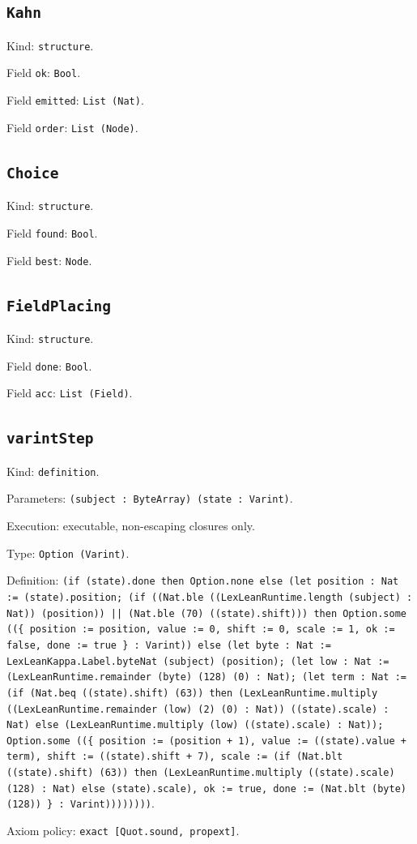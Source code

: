 \documentclass[11pt]{article}
\begin{document}
\subsection*{\texttt{Kahn}}
\noindent Kind: \texttt{structure}.\par
\noindent Field \texttt{ok}: \texttt{Bool}.\par
\noindent Field \texttt{emitted}: \texttt{List (Nat)}.\par
\noindent Field \texttt{order}: \texttt{List (Node)}.\par
\subsection*{\texttt{Choice}}
\noindent Kind: \texttt{structure}.\par
\noindent Field \texttt{found}: \texttt{Bool}.\par
\noindent Field \texttt{best}: \texttt{Node}.\par
\subsection*{\texttt{FieldPlacing}}
\noindent Kind: \texttt{structure}.\par
\noindent Field \texttt{done}: \texttt{Bool}.\par
\noindent Field \texttt{acc}: \texttt{List (Field)}.\par
\subsection*{\texttt{varintStep}}
\noindent Kind: \texttt{definition}.\par
\noindent Parameters: \texttt{(subject : ByteArray) (state : Varint)}.\par
\noindent Execution: executable, non-escaping closures only.\par
\noindent Type: \texttt{Option (Varint)}.\par
\noindent Definition: \texttt{(if (state).done then Option.none else (let position : Nat := (state).position; (if ((Nat.ble ((LexLeanRuntime.length (subject) : Nat)) (position)) || (Nat.ble (70) ((state).shift))) then Option.some ((\{ position := position, value := 0, shift := 0, scale := 1, ok := false, done := true \} : Varint)) else (let byte : Nat := LexLeanKappa.Label.byteNat (subject) (position); (let low : Nat := (LexLeanRuntime.remainder (byte) (128) (0) : Nat); (let term : Nat := (if (Nat.beq ((state).shift) (63)) then (LexLeanRuntime.multiply ((LexLeanRuntime.remainder (low) (2) (0) : Nat)) ((state).scale) : Nat) else (LexLeanRuntime.multiply (low) ((state).scale) : Nat)); Option.some ((\{ position := (position + 1), value := ((state).value + term), shift := ((state).shift + 7), scale := (if (Nat.blt ((state).shift) (63)) then (LexLeanRuntime.multiply ((state).scale) (128) : Nat) else (state).scale), ok := true, done := (Nat.blt (byte) (128)) \} : Varint))))))))}.\par
\noindent Axiom policy: \texttt{exact [Quot.sound, propext]}.\par
\end{document}
